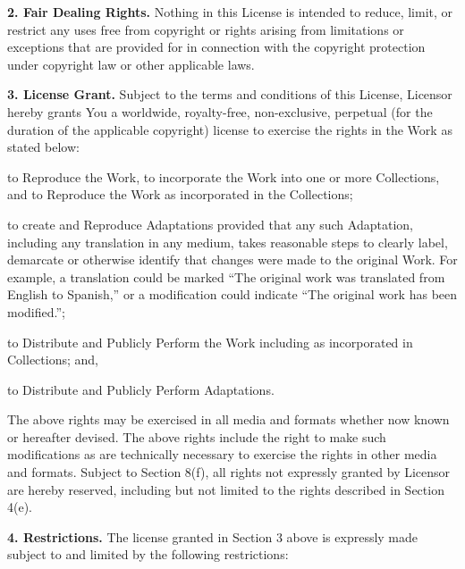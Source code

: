 \par \textbf{2. Fair Dealing Rights.} Nothing in this
License is intended to reduce, limit, or restrict any uses
free from copyright or rights arising from limitations or
exceptions that are provided for in connection with the
copyright protection under copyright law or other
applicable laws.
\par \textbf{3. License Grant.} Subject to the terms
and conditions of this License, Licensor hereby grants You
a worldwide, royalty-free, non-exclusive, perpetual (for
the duration of the applicable copyright) license to
exercise the rights in the Work as stated below:
\begin{doclicense@enumerate}
\item to Reproduce the Work, to incorporate the Work into
one or more Collections, and to Reproduce the Work as
incorporated in the Collections;
\item to create and Reproduce Adaptations provided that any
such Adaptation, including any translation in any medium,
takes reasonable steps to clearly label, demarcate or
otherwise identify that changes were made to the original
Work. For example, a translation could be marked ``The
original work was translated from English to Spanish,'' or
a modification could indicate ``The original work has been
modified.'';
\item to Distribute and Publicly Perform the Work including
as incorporated in Collections; and,
\item to Distribute and Publicly Perform Adaptations.
\end{doclicense@enumerate}
\par The above rights may be exercised in all media and
formats whether now known or hereafter devised. The above
rights include the right to make such modifications as are
technically necessary to exercise the rights in other media
and formats. Subject to Section 8(f), all rights not
expressly granted by Licensor are hereby reserved,
including but not limited to the rights described in
Section 4(e).
\par \textbf{4. Restrictions.} The license granted in
Section 3 above is expressly made subject to and limited by
the following restrictions:
